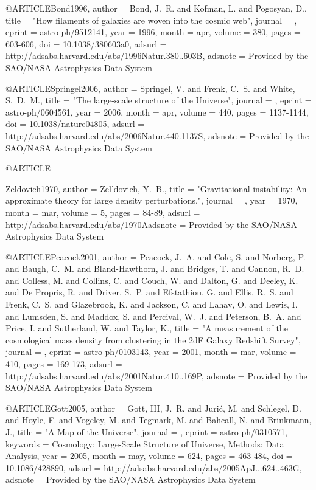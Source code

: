 \documentclass{aa}
\begin{document}
{{{{{{{{{@ARTICLE{Bond1996,
   author = {{Bond}, J.~R. and {Kofman}, L. and {Pogosyan}, D.},
    title = "{How filaments of galaxies are woven into the cosmic web}",
  journal = {\nat},
   eprint = {astro-ph/9512141},
     year = 1996,
    month = apr,
   volume = 380,
    pages = {603-606},
      doi = {10.1038/380603a0},
   adsurl = {http://adsabs.harvard.edu/abs/1996Natur.380..603B},
  adsnote = {Provided by the SAO/NASA Astrophysics Data System}
}

@ARTICLE{Springel2006,
   author = {{Springel}, V. and {Frenk}, C.~S. and {White}, S.~D.~M.},
    title = "{The large-scale structure of the Universe}",
  journal = {\nat},
   eprint = {astro-ph/0604561},
     year = 2006,
    month = apr,
   volume = 440,
    pages = {1137-1144},
      doi = {10.1038/nature04805},
   adsurl = {http://adsabs.harvard.edu/abs/2006Natur.440.1137S},
  adsnote = {Provided by the SAO/NASA Astrophysics Data System}
}

@ARTICLE{Zeldovich1970,
   author = {{Zel'dovich}, Y.~B.},
    title = "{Gravitational instability: An approximate theory for large density perturbations.}",
  journal = {\aap},
     year = 1970,
    month = mar,
   volume = 5,
    pages = {84-89},
   adsurl = {http://adsabs.harvard.edu/abs/1970Aadsnote = {Provided by the SAO/NASA Astrophysics Data System}
}

@ARTICLE{Peacock2001,
   author = {{Peacock}, J.~A. and {Cole}, S. and {Norberg}, P. and {Baugh}, C.~M. and 
	{Bland-Hawthorn}, J. and {Bridges}, T. and {Cannon}, R.~D. and 
	{Colless}, M. and {Collins}, C. and {Couch}, W. and {Dalton}, G. and 
	{Deeley}, K. and {De Propris}, R. and {Driver}, S.~P. and {Efstathiou}, G. and 
	{Ellis}, R.~S. and {Frenk}, C.~S. and {Glazebrook}, K. and {Jackson}, C. and 
	{Lahav}, O. and {Lewis}, I. and {Lumsden}, S. and {Maddox}, S. and 
	{Percival}, W.~J. and {Peterson}, B.~A. and {Price}, I. and 
	{Sutherland}, W. and {Taylor}, K.},
    title = "{A measurement of the cosmological mass density from clustering in the 2dF Galaxy Redshift Survey}",
  journal = {\nat},
   eprint = {astro-ph/0103143},
     year = 2001,
    month = mar,
   volume = 410,
    pages = {169-173},
   adsurl = {http://adsabs.harvard.edu/abs/2001Natur.410..169P},
  adsnote = {Provided by the SAO/NASA Astrophysics Data System}
}

@ARTICLE{Gott2005,
   author = {{Gott}, III, J.~R. and {Juri{\'c}}, M. and {Schlegel}, D. and 
	{Hoyle}, F. and {Vogeley}, M. and {Tegmark}, M. and {Bahcall}, N. and 
	{Brinkmann}, J.},
    title = "{A Map of the Universe}",
  journal = {\apj},
   eprint = {astro-ph/0310571},
 keywords = {Cosmology: Large-Scale Structure of Universe, Methods: Data Analysis},
     year = 2005,
    month = may,
   volume = 624,
    pages = {463-484},
      doi = {10.1086/428890},
   adsurl = {http://adsabs.harvard.edu/abs/2005ApJ...624..463G},
  adsnote = {Provided by the SAO/NASA Astrophysics Data System}
}

}}}}}}}}}}
\end{document}
